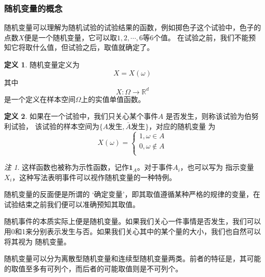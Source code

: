 \documentclass[a4paper,11pt]{article}%
\theoremstyle{remark}
\newtheorem*{remark}{注}
\theoremstyle{remark}
\theoremstyle{definition}
\theoremstyle{definition}
\newtheorem*{definition}{定义}
\theoremstyle{plain}
\begin{document}
\subsubsection{随机变量的概念}
随机变量可以理解为随机试验的试验结果的函数，例如掷色子这个试验中，色子的点数$X$便是一个随机变量，它可以取$1,2,\cdots,6$等6个值。
在试验之前，我们不能预知它将取什么值，但试验之后，取值就确定了。
\begin{definition}
    随机变量定义为
    \[X=X(\omega)\]
    其中
    \[X: \Omega\rightarrow\mathbb{R}^d\]
    是一个定义在样本空间$\Omega$上的实值单值函数。
\end{definition}
\begin{definition}
    如果在一个试验中，我们只关心某个事件$A$ 是否发生，则称该试验为伯努利试验，
    该试验的样本空间为$\{A \text{发生},\bar{A}\text{发生}\}$，对应的随机变量
    为
    \[X(\omega)=\begin{cases}
        1,\omega\in A\\
        0,\omega\notin A\\
    \end{cases}\]
\end{definition}
\begin{remark}
    这样函数也被称为示性函数，记作$\mathbf{1}_A$。对于事件$A_i$，也可以写为 指示变量$X_i$，这种写法表明事件可以视作随机变量的一种特例。
\end{remark}
随机变量的反面便是所谓的 `确定变量'，即其取值遵循某种严格的规律的变量，在试验结束之前我们便可以准确预知其取值。

随机事件的本质实际上便是随机变量。如果我们关心一件事情是否发生，我们可以用0和1来分别表示发生与否。如果我们关心其中的某个量的大小，我们也自然可以将其视为
随机变量。 

随机变量可以分为离散型随机变量和连续型随机变量两类。前者的特征是，其可能的取值至多有可列个，而后者的可能取值则是不可列个。
\end{document}
